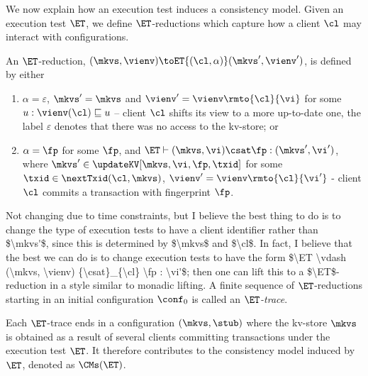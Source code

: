 We now explain how an execution test induces a consistency model. Given an execution test $\ET$, 
we define $\ET$-reductions which capture how a client $\cl$ may
interact with configurations. 
\begin{definition}[ET-reduction]
An $\ET$-reduction, $(\mkvs, \vienv) \toET{(\cl, \alpha)} (\mkvs', \vienv')$, is defined by
either 
\begin{enumerate}
    \item $\alpha = \varepsilon$, $\mkvs' = \mkvs$ and $\vienv' = \vienv\rmto{\cl}{\vi}$ for some $u: \vienv(\cl) \sqsubseteq u$ --
	client $\cl$ shifts its view to a more up-to-date one, the label $\varepsilon$ denotes that 
	there was no access to the kv-store; or
\item $\alpha = \fp$ for some $\fp$, and $\ET \vdash (\mkvs, \vi ) \csat \fp : (\mkvs', \vi')$, where $\mkvs' \in \updateKV[\mkvs, \vi, \fp, \txid]$ 
   for some $\txid \in \nextTxid(\cl, \mkvs)$, $\vienv' =
   \vienv\rmto{\cl}{\vi'}$ -  client $\cl$ 
	commits a transaction with fingerprint $\fp$.
\end{enumerate}
\ac{Not changing due to time constraints, but I believe the best thing to do is to change the type of execution tests to have a client identifier 
rather than $\mkvs'$, since this is determined by $\mkvs$ and $\cl$. In fact, I believe that the best we can do is to change execution tests to 
have the form $\ET \vdash (\mkvs, \vienv) {\csat}_{\cl} \fp : \vi'$; then one can lift this to a $\ET$-reduction in a style similar to monadic lifting.}
A finite sequence of $\ET$-reductions starting in an
initial configuration $\conf_{0}$ is called  an \emph{$\ET$-trace}. 
\end{definition}
Each $\ET$-trace  ends in a configuration $(\mkvs, \stub)$ where the 
kv-store $\mkvs$ is obtained as a result of several clients committing transactions under the 
execution test $\ET$. It therefore contributes to the consistency model induced by $\ET$, 
denoted as $\CMs(\ET)$.
%
